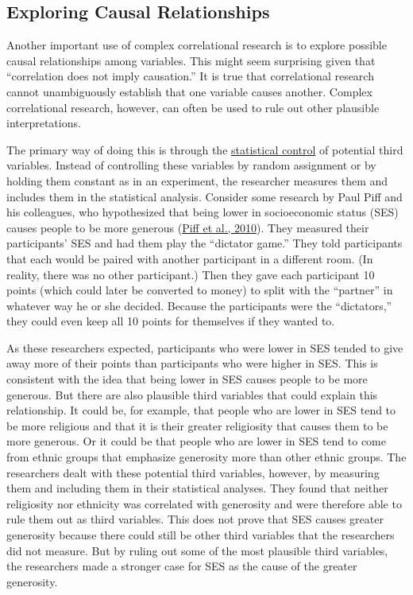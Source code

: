 \documentclass[
]{krantz}
\begin{document}
\hypertarget{exploring-causal-relationships}{%
\subsection*{Exploring Causal Relationships}\label{exploring-causal-relationships}}


Another important use of complex correlational research is to explore possible causal relationships among variables. This might seem surprising given that ``correlation does not imply causation.'' It is true that correlational research cannot unambiguously establish that one variable causes another. Complex correlational research, however, can often be used to rule out other plausible interpretations.

The primary way of doing this is through the \protect\hyperlink{statistical-control}{statistical control} of potential third variables. Instead of controlling these variables by random assignment or by holding them constant as in an experiment, the researcher measures them and includes them in the statistical analysis. Consider some research by Paul Piff and his colleagues, who hypothesized that being lower in socioeconomic status (SES) causes people to be more generous (\protect\hyperlink{ref-piff2010having}{Piff et al., 2010}). They measured their participants' SES and had them play the ``dictator game.'' They told participants that each would be paired with another participant in a different room. (In reality, there was no other participant.) Then they gave each participant 10 points (which could later be converted to money) to split with the ``partner'' in whatever way he or she decided. Because the participants were the ``dictators,'' they could even keep all 10 points for themselves if they wanted to.

As these researchers expected, participants who were lower in SES tended to give away more of their points than participants who were higher in SES. This is consistent with the idea that being lower in SES causes people to be more generous. But there are also plausible third variables that could explain this relationship. It could be, for example, that people who are lower in SES tend to be more religious and that it is their greater religiosity that causes them to be more generous. Or it could be that people who are lower in SES tend to come from ethnic groups that emphasize generosity more than other ethnic groups. The researchers dealt with these potential third variables, however, by measuring them and including them in their statistical analyses. They found that neither religiosity nor ethnicity was correlated with generosity and were therefore able to rule them out as third variables. This does not prove that SES causes greater generosity because there could still be other third variables that the researchers did not measure. But by ruling out some of the most plausible third variables, the researchers made a stronger case for SES as the cause of the greater generosity.
\end{document}

